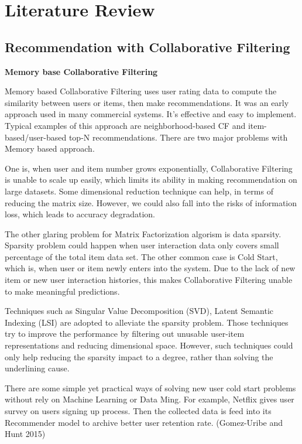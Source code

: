 \section{Literature Review}

\subsection{Recommendation with Collaborative Filtering}
\bigskip
\textbf{Memory base Collaborative Filtering}

Memory based Collaborative Filtering uses user rating data to compute the similarity between users or items, then make recommendations. It was an early approach used in many commercial systems. It's effective and easy to implement. Typical examples of this approach are neighborhood-based CF and item-based/user-based top-N recommendations. There are two major problems with Memory based approach.  

One is, when user and item number grows exponentially, Collaborative Filtering is unable to scale up easily, which limits its ability in making recommendation on large datasets. Some dimensional reduction technique can help, in terms of reducing the matrix size. However, we could also fall into the risks of information loss, which leads to accuracy degradation.  

The other glaring problem for Matrix Factorization algorism is data sparsity. Sparsity problem could happen when user interaction data only covers small percentage of the total item data set. The other common case is Cold Start, which is, when user or item newly enters into the system. Due to the lack of new item or new user interaction histories, this makes Collaborative Filtering unable to make meaningful predictions.  

Techniques such as Singular Value Decomposition (SVD), Latent Semantic Indexing (LSI) are adopted to alleviate the sparsity problem. Those techniques try to improve the performance by filtering out unusable user-item representations and reducing dimensional space. However, such techniques could only help reducing the sparsity impact to a degree, rather than solving the underlining cause. 

There are some simple yet practical ways of solving new user cold start problems without rely on Machine Learning or Data Ming. For example, Netflix gives user survey on users signing up process. Then the collected data is feed into its Recommender model to archive better user retention rate. (Gomez-Uribe and Hunt 2015) 


